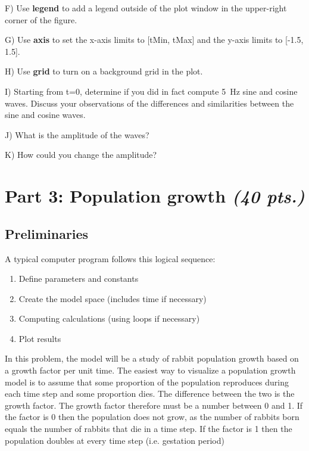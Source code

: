 \documentclass[10pt]{article}
\begin{document}
F) Use \textbf{legend} to add a legend outside of the plot window in the upper-right corner of the figure. 

G) Use \textbf{axis} to set the x-axis limits to [tMin, tMax] and the y-axis limits to [-1.5, 1.5]. 

H) Use \textbf{grid} to turn on a background grid in the plot.

I) Starting from t=0, determine if you did in fact compute 5~Hz sine and cosine waves. Discuss your observations of the differences and similarities between the sine and cosine waves.

J) What is the amplitude of the waves?

K) How could you change the amplitude?

\pagebreak
\section*{Part 3: Population growth \textit{(40 pts.)}}

\subsection*{Preliminaries}

A typical computer program follows this logical sequence:
\begin{enumerate}
	\item Define parameters and constants
	\item Create the model space (includes time if necessary)
	\item Computing calculations (using loops if necessary)
	\item Plot results
\end{enumerate}

In this problem, the model will be a study of rabbit population growth based on a growth factor per unit time. The easiest way to visualize a population growth model is to assume that some proportion of the population reproduces during each time step and some proportion dies. The difference between the two is the growth factor. The growth factor therefore must be a number between 0 and 1. If the factor is 0 then the population does not grow, as the number of rabbits born equals the number of rabbits that die in a time step. If the factor is 1 then the population doubles at every time step (i.e. gestation period)
\end{document}
